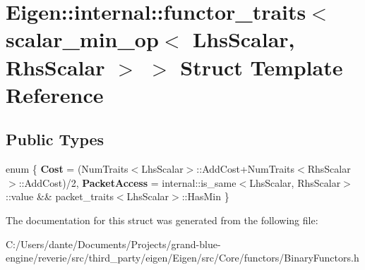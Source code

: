 \hypertarget{struct_eigen_1_1internal_1_1functor__traits_3_01scalar__min__op_3_01_lhs_scalar_00_01_rhs_scalar_01_4_01_4}{}\section{Eigen\+::internal\+::functor\+\_\+traits$<$ scalar\+\_\+min\+\_\+op$<$ Lhs\+Scalar, Rhs\+Scalar $>$ $>$ Struct Template Reference}
\label{struct_eigen_1_1internal_1_1functor__traits_3_01scalar__min__op_3_01_lhs_scalar_00_01_rhs_scalar_01_4_01_4}
\subsection*{Public Types}
\begin{DoxyCompactItemize}
\item 
\mbox{\label{struct_eigen_1_1internal_1_1functor__traits_3_01scalar__min__op_3_01_lhs_scalar_00_01_rhs_scalar_01_4_01_4_af3ee402d395ac9c7f7457336f0b4ee2e}} 
enum \{ {\bfseries Cost} = (Num\+Traits$<$Lhs\+Scalar$>$\+::Add\+Cost+\+Num\+Traits$<$Rhs\+Scalar$>$\+::Add\+Cost)/2, 
{\bfseries Packet\+Access} = internal\+::is\+\_\+same$<$Lhs\+Scalar, Rhs\+Scalar$>$\+::value \&\& packet\+\_\+traits$<$Lhs\+Scalar$>$\+::Has\+Min
 \}
\end{DoxyCompactItemize}


The documentation for this struct was generated from the following file\+:\begin{DoxyCompactItemize}
\item 
C\+:/\+Users/dante/\+Documents/\+Projects/grand-\/blue-\/engine/reverie/src/third\+\_\+party/eigen/\+Eigen/src/\+Core/functors/Binary\+Functors.\+h\end{DoxyCompactItemize}
